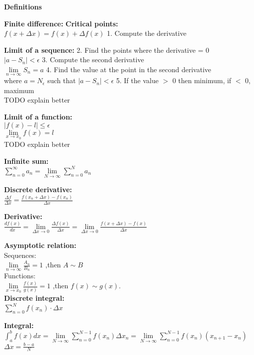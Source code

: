 \documentclass[12pt,a4paper]{report}
\begin{document}
	
	\begin{center}\textbf{Definitions}\end{center}
	
	\textbf{Finite difference:} 									\hfill \textbf{Critical points:}\\
	$f(x + \Delta x) = f(x) + \Delta f(x)$ 							\hfill 1. Compute the derivative

	\textbf{Limit of a sequence:}									\hfill 2. Find the points where the derivative = 0\\
	$|a - S_n| < \epsilon$											\hfill 3. Compute the second derivative\\
	$\lim\limits_{n \to \infty} S_n = a$							\hfill 4. Find the value at the point in the second derivative\\
	where $a = N_\epsilon$ such that $|a - S_n| < \epsilon$			\hfill 5. If the value $>$ 0 then minimum, if $<$ 0, maximum\\
	TODO explain better

	\textbf{Limit of a function:}\\
	$|f(x) - l| \leq \epsilon$\\
	$\lim\limits_{x \to x_0} f(x) = l$\\
	TODO explain better
	
	\textbf{Infinite sum:}\\
	$\sum_{n = 0}^{\infty} a_n = \lim\limits_{N \to \infty} \sum_{n = 0}^{N} a_n$
	
	\textbf{Discrete derivative:}\\
	$\frac{\Delta f}{\Delta x} = \frac{f(x_n + \Delta x) - f(x_n)}{\Delta x}$
	
	\textbf{Derivative:}\\
	$\frac{df(x)}{dx} = \lim\limits_{\Delta x \to 0} \frac{\Delta f(x)}{\Delta x} = \lim\limits_{\Delta x \to 0} \frac{f(x + \Delta x) - f(x)}{\Delta x}$
	
	\textbf{Asymptotic relation:}\\
	Sequences:\\
	$\lim\limits_{n \to \infty} \frac{A_n}{B_n} = 1$ ,then $A \sim B$\\
	Functions:\\
	$\lim\limits_{x \to x_0} \frac{f(x)}{g(x)} = 1$ ,then $f(x) \sim g(x).$\\
	
	\textbf{Discrete integral:}\\
	$\sum_{n = 0}^{N} f(x_n) \cdot \Delta x$
	
	\textbf{Integral:}\\
	$\int_{a}^{b} f(x) dx = \lim\limits_{N \to \infty} \sum_{n = 0}^{N - 1} f(x_n) \Delta x_n = \lim\limits_{N \to \infty} \sum_{n = 0}^{N - 1} f(x_n)(x_{n+1} - x_n)$\\
	$\Delta x = \frac{b - a}{N}$
	
\end{document}
